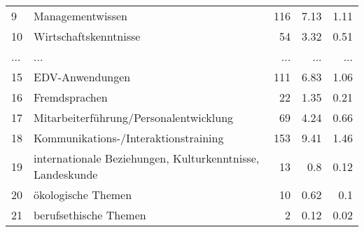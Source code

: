 \begin{longtable}{lXrrr}
        9 & \multicolumn{1}{X}{Managementwissen} & %
          \num{116} &
          \num[round-mode=places,round-precision=2]{7.13} &
          \num[round-mode=places,round-precision=2]{1.11} \\
        10 & \multicolumn{1}{X}{Wirtschaftskenntnisse} & %
          \num{54} &
          \num[round-mode=places,round-precision=2]{3.32} &
          \num[round-mode=places,round-precision=2]{0.51} \\
       ... & ... & ... & ... & ... \\
        15 & \multicolumn{1}{X}{EDV-Anwendungen} & %
          \num{111} &
          \num[round-mode=places,round-precision=2]{6.83} &
          \num[round-mode=places,round-precision=2]{1.06} \\

        16 & \multicolumn{1}{X}{Fremdsprachen} & %
          \num{22} &
          \num[round-mode=places,round-precision=2]{1.35} &
          \num[round-mode=places,round-precision=2]{0.21} \\

        17 & \multicolumn{1}{X}{Mitarbeiterführung/Personalentwicklung} & %
          \num{69} &
          \num[round-mode=places,round-precision=2]{4.24} &
          \num[round-mode=places,round-precision=2]{0.66} \\

        18 & \multicolumn{1}{X}{Kommunikations-/Interaktionstraining} & %
          \num{153} &
          \num[round-mode=places,round-precision=2]{9.41} &
          \num[round-mode=places,round-precision=2]{1.46} \\

        19 & \multicolumn{1}{X}{internationale Beziehungen, Kulturkenntnisse, Landeskunde} & %
          \num{13} &
          \num[round-mode=places,round-precision=2]{0.8} &
          \num[round-mode=places,round-precision=2]{0.12} \\

        20 & \multicolumn{1}{X}{ökologische Themen} & %
          \num{10} &
          \num[round-mode=places,round-precision=2]{0.62} &
          \num[round-mode=places,round-precision=2]{0.1} \\

        21 & \multicolumn{1}{X}{berufsethische Themen} & %
          \num{2} &
          \num[round-mode=places,round-precision=2]{0.12} &
          \num[round-mode=places,round-precision=2]{0.02} \\


\end{longtable}
